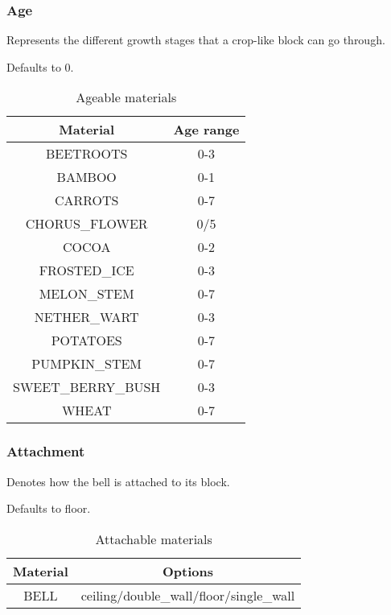 \subsubsection{Age}
Represents the different growth stages that a crop-like block can go through.

Defaults to 0.

\begin{table}[H]
	\centering
	\begin{tabular}{ |c|c| }
		\hline
		Material & Age range \\
		\hline
		BEETROOTS & 0-3 \\
		BAMBOO & 0-1 \\
		CARROTS & 0-7 \\
		CHORUS\_FLOWER & 0/5\footnotemark \\
		COCOA & 0-2 \\
		FROSTED\_ICE & 0-3 \\
		MELON\_STEM & 0-7 \\
		NETHER\_WART & 0-3 \\
		POTATOES & 0-7 \\
		PUMPKIN\_STEM & 0-7 \\
		SWEET\_BERRY\_BUSH & 0-3 \\
		WHEAT & 0-7 \\
		\hline
	\end{tabular}
	\caption{Ageable materials}
\end{table}


\subsubsection{Attachment}
Denotes how the bell is attached to its block.

Defaults to floor.

\begin{table}[H]
	\centering
	\begin{tabular}{ |c|c| }
		\hline
		Material & Options \\
		\hline
		BELL & ceiling/double\_wall/floor/single\_wall \\
		\hline
	\end{tabular}
	\caption{Attachable materials}
\end{table}

